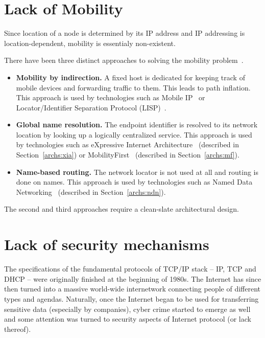     \section{Lack of Mobility}\label{problems:mobility}

        Since location of a node is determined by its IP address and IP addressing is location-dependent, mobility is essentialy non-existent.

        There have been three distinct approaches to solving the mobility problem~\cite{MobilityFirst}.

        \begin{itemize}
            \item \textbf{Mobility by indirection.} A fixed host is dedicated for keeping track of mobile devices and forwarding traffic to them. This leads to path inflation.
            This approach is used by technologies such as Mobile IP~\cite{rfc5944} or Locator/Identifier Separation Protocol (LISP)~\cite{rfc6830}.
            \item \textbf{Global name resolution.} The endpoint identifier is resolved to its network location by looking up a logically centralized service.
            This approach is used by technologies such as eXpressive Internet Architecture~\cite{xia} (described in Section~\ref{archs:xia}) or MobilityFirst~\cite{MobilityFirst} (described in Section~\ref{archs:mf}).
            \item \textbf{Name-based routing.} The network locator is not used at all and routing is done on names.
            This approach is used by technologies such as Named Data Networking~\cite{ndn} (described in Section~\ref{archs:ndn}).
        \end{itemize}

        The second and third approaches require a clean-slate architectural design.

    \section{Lack of security mechanisms}\label{problems:security}

        The specifications of the fundamental protocols of TCP/IP stack -- IP, TCP and DHCP -- were originally finished at the beginning of 1980s. The Internet has since then turned into a massive world-wide internetwork connecting people of different types and agendas. Naturally, once the Internet began to be used for transferring sensitive data (especially by companies), cyber crime started to emerge as well and some attention was turned to security aspects of Internet protocol (or lack thereof).

